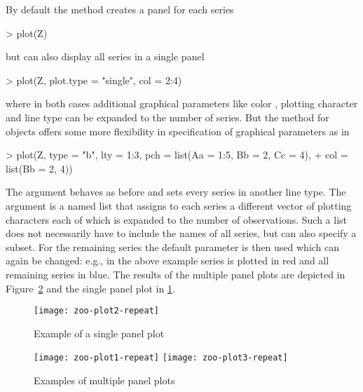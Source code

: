 \documentclass{Z}
\begin{document}
By default the  method creates a panel for each series
\begin{Schunk}
\begin{Sinput}
> plot(Z)
\end{Sinput}
\end{Schunk}
but can also display all series in a single panel
\begin{Schunk}
\begin{Sinput}
> plot(Z, plot.type = "single", col = 2:4)
\end{Sinput}
\end{Schunk}
where in both cases additional graphical parameters like color ,
plotting character  and line type  can be
expanded to the number of series. But the  method for
 objects offers some more flexibility in specification
of graphical parameters as in
\begin{Schunk}
\begin{Sinput}
> plot(Z, type = "b", lty = 1:3, pch = list(Aa = 1:5, Bb = 2, Cc = 4), 
+     col = list(Bb = 2, 4))
\end{Sinput}
\end{Schunk}
The argument  behaves as before and sets every series in another
line type. The  argument is a named list that assigns to each series
a different vector of plotting characters each of which is expanded to the 
number of observations. Such a list does not necessarily have to include the names of all
series, but can also specify a subset. For the remaining series the default parameter
is then used which can again be changed: e.g., in the above example series  is
plotted in red and all remaining series in blue. The results of the multiple panel plots
are depicted in Figure~\ref{fig:plot13} and the single panel plot in \ref{fig:plot2}.

\begin{figure}[tbh]
\begin{center}
\texttt{[image: zoo-plot2-repeat]}
\caption{\label{fig:plot2} Example of a single panel plot}
\end{center}
\end{figure}


\begin{figure}[p]
\begin{center}
\texttt{[image: zoo-plot1-repeat]}
\texttt{[image: zoo-plot3-repeat]}
\caption{\label{fig:plot13} Examples of multiple panel plots}
\end{center}
\end{figure}
\end{document}
